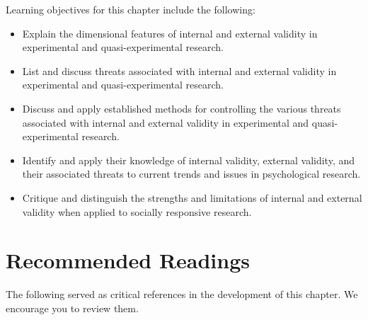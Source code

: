 \documentclass[
  11pt,
]{book}
\providecommand{\tightlist}{%
  \setlength{\itemsep}{0pt}\setlength{\parskip}{0pt}}
\begin{document}
Learning objectives for this chapter include the following:

\begin{itemize}
\tightlist
\item
  Explain the dimensional features of internal and external validity in experimental and quasi-experimental research.
\item
  List and discuss threats associated with internal and external validity in experimental and quasi-experimental research.
\item
  Discuss and apply established methods for controlling the various threats associated with internal and external validity in experimental and quasi-experimental research.
\item
  Identify and apply their knowledge of internal validity, external validity, and their associated threats to current trends and issues in psychological research.
\item
  Critique and distinguish the strengths and limitations of internal and external validity when applied to socially responsive research.
\end{itemize}

\section{Recommended Readings}\label{recommended-readings}

The following served as critical references in the development of this chapter. We encourage you to review them.
\end{document}
